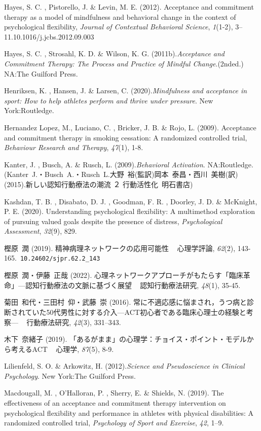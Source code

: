 \documentclass[12pt,a4paper,xelatex,ja=standard]{bxjsarticle}
\begin{document}
Hayes, S. C. , Pistorello, J. \& Levin, M. E. (2012). Acceptance and
commitment therapy as a model of mindfulness and behavioral change in
the context of psychological flexibility,
\emph{Journal of Contextual Behavioral Science}, \emph{1}(1-2),
3--11.10.1016/j.jcbs.2012.09.003

Hayes, S. C. , Strosahl, K. D. \& Wilson, K. G.
(2011b).\emph{Acceptance and Commitment Therapy: The Process and Practice of Mindful Change}.(2nded.)
NA:The Guilford Press.

Henriksen, K. , Hansen, J. \& Larsen, C.
(2020).\emph{Mindfulness and acceptance in sport: How to help athletes perform and thrive under pressure}.
New York:Routledge.

Hernandez Lopez, M., Luciano, C. , Bricker, J. B. \& Rojo, L. (2009).
Acceptance and commitment therapy in smoking cessation: A randomized
controlled trial, \emph{Behaviour Research and Therapy}, \emph{47}(1),
1-8.

Kanter, J. , Busch, A. \& Rusch, L. (2009).\emph{Behavioral Activation}.
NA:Routledge.(Kanter~J.・Busch~A.・Rusch~L.大野~裕(監訳)岡本~泰昌・西川~美樹(訳)(2015).新しい認知行動療法の潮流
２ 行動活性化~明石書店)

Kashdan, T. B. , Disabato, D. J. , Goodman, F. R. , Doorley, J. D. \&
McKnight, P. E. (2020). Understanding psychological flexibility: A
multimethod exploration of pursuing valued goals despite the presence of
distress, \emph{Psychological Assessment}, \emph{32}(9), 829.

樫原~潤 (2019). 精神病理ネットワークの応用可能性 ~ 心理学評論,
\emph{62}(2), 143-165.~\verb|10.24602/sjpr.62.2_143|

樫原~潤・伊藤~正哉 (2022).
心理ネットワークアプローチがもたらす「臨床革命」---認知行動療法の文脈に基づく展望
~ 認知行動療法研究, \emph{48}(1), 35-45.

菊田~和代・三田村~仰・武藤~崇 (2016).
常に不適応感に悩まされ，うつ病と診断されていた50代男性に対する介入---ACT初心者である臨床心理士の経験と考察---
~ 行動療法研究, \emph{42}(3), 331--343.

木下~奈緒子 (2019).
「あるがまま」の心理学：チョイス・ポイント・モデルから考えるACT ~
心理学, \emph{87}(5), 8-9.

Lilienfeld, S. O. \& Arkowitz, H.
(2012).\emph{Science and Pseudoscience in Clinical Psychology}. New
York:The Guilford Press.

Macdougall, M. , O'Halloran, P. , Sherry, E. \& Shields, N. (2019). The
effectiveness of an acceptance and commitment therapy intervention on
psychological flexibility and performance in athletes with physical
disabilities: A randomized controlled trial,
\emph{Psychology of Sport and Exercise}, \emph{42}, 1--9.
\end{document}
